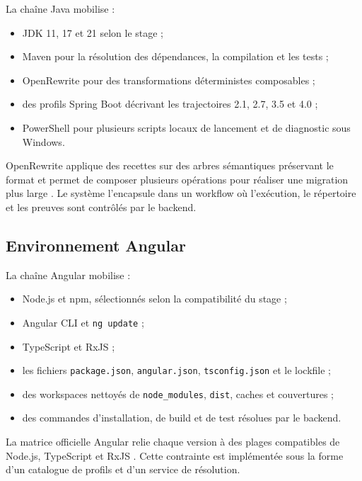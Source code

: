 La chaîne Java mobilise :

\begin{itemize}
    \item JDK 11, 17 et 21 selon le stage ;
    \item Maven pour la résolution des dépendances, la compilation et les tests ;
    \item OpenRewrite pour des transformations déterministes composables ;
    \item des profils Spring Boot décrivant les trajectoires 2.1, 2.7, 3.5 et 4.0 ;
    \item PowerShell pour plusieurs scripts locaux de lancement et de diagnostic sous Windows.
\end{itemize}

OpenRewrite applique des recettes sur des arbres sémantiques préservant le format et permet de composer plusieurs opérations pour réaliser une migration plus large \cite{openrewrite-recipes}. Le système l'encapsule dans un workflow où l'exécution, le répertoire et les preuves sont contrôlés par le backend.

\subsection{Environnement Angular}

La chaîne Angular mobilise :

\begin{itemize}
    \item Node.js et npm, sélectionnés selon la compatibilité du stage ;
    \item Angular CLI et \texttt{ng update} ;
    \item TypeScript et RxJS ;
    \item les fichiers \texttt{package.json}, \texttt{angular.json}, \texttt{tsconfig.json} et le lockfile ;
    \item des workspaces nettoyés de \texttt{node\_modules}, \texttt{dist}, caches et couvertures ;
    \item des commandes d'installation, de build et de test résolues par le backend.
\end{itemize}

La matrice officielle Angular relie chaque version à des plages compatibles de Node.js, TypeScript et RxJS \cite{angular-versions}. Cette contrainte est implémentée sous la forme d'un catalogue de profils et d'un service de résolution.

